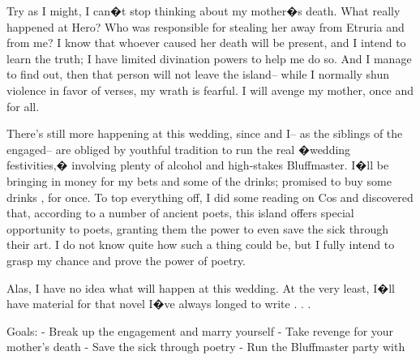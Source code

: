 \documentclass[char]{Kos}
\begin{document}
Try as I might, I can�t stop thinking about my mother�s death. What really happened at Hero? Who was responsible for stealing her away from Etruria and from me? I know that whoever caused her death will be present, and I intend to learn the truth; I have limited divination powers to help me do so. And I manage to find out, then that person will not leave the island-- while I normally shun violence in favor of verses, my wrath is fearful. I will avenge my mother, once and for all.

There's still more happening at this wedding, since \cWard{\nickname} and I-- as the siblings of the engaged-- are obliged by youthful tradition to run the real �wedding festivities,� involving plenty of alcohol and high-stakes Bluffmaster. I�ll be bringing in money for my bets and some of the drinks; \cWard{\nickname} promised to buy some drinks \cWard{\themselves}, for once. To top everything off, I did some reading on Cos and discovered that, according to a number of ancient poets, this island offers special opportunity to poets, granting them the power to even save the sick through their art. I do not know quite how such a thing could be, but I fully intend to grasp my chance and prove the power of poetry.

Alas, I have no idea what will happen at this wedding. At the very least, I�ll have material for that novel I�ve always longed to write . . . 

Goals:
- Break up the engagement and marry \cBride{\nickname} yourself
- Take revenge for your mother's death
- Save the sick through poetry
- Run the Bluffmaster party with \cWard{\nickname}
\end{document}

